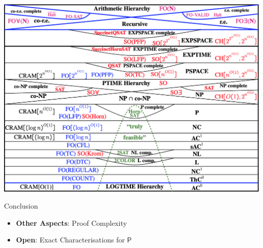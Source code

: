 \documentclass[usenames,dvipsnames]{beamer}
\newcommand{\PTime}{\mathsf{P}}
\begin{document}
\begin{frame}
    \includegraphics[scale = 0.3]{images/descriptiveWorld2023.jpg}
\end{frame}

\begin{frame}{Conclusion}
    \begin{itemize}
        \item \textbf{Other Aspects}: Proof Complexity
        \item \textbf{Open}: Exact Characterisations for $\PTime$
    \end{itemize}
\end{frame}
 
\end{document}
